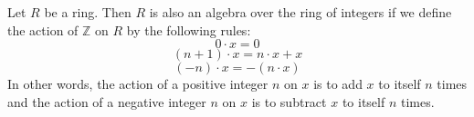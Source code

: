 \documentclass[12pt]{article}
\begin{document}
Let $R$ be a ring.  Then $R$ is also an algebra over the ring of integers if we define the action of $\mathbb{Z}$ on $R$ by the following rules:
 \[0 \cdot x = 0\]
 \[(n + 1) \cdot x = n \cdot x + x\]
 \[(-n) \cdot x = -(n \cdot x)\]
In other words, the action of a positive integer $n$ on $x$ is to add $x$ to itself $n$ times and the action of a negative integer $n$ on $x$ is to subtract $x$ to itself $n$ times.
\end{document}
